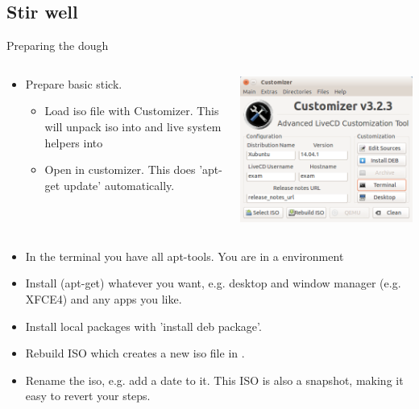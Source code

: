 \subsection[Stir well]{Stir well}
\begin{frame}{Preparing the dough}
  \begin{columns}
    \begin{column}[c]{.6\textwidth}
      \begin{itemize}
      \item Prepare basic stick.
        \begin{itemize}
        \item Load iso file with Customizer. This will unpack iso into
           and live system helpers into 
        \item Open  in customizer. This does 'apt-get
          update' automatically. 
        \end{itemize}
      \end{itemize}
    \end{column}
    \begin{column}[c]{.4\textwidth}
      \includegraphics[width=\textwidth]{figures/customizer.png}
    \end{column}
  \end{columns}
  \begin{itemize}
  \item In the terminal you have all apt-tools. You are in a  environment
  \item Install (apt-get) whatever you want, e.g. desktop and window manager
    (e.g. XFCE4) and any apps you like.
  \item Install local  packages with 'install deb
    package'.
  \item Rebuild ISO which creates a new iso file in .
  \item Rename the iso, e.g. add a date to it. This ISO is also a
    snapshot, making it easy to revert your steps.
  \end{itemize}
\end{frame}


